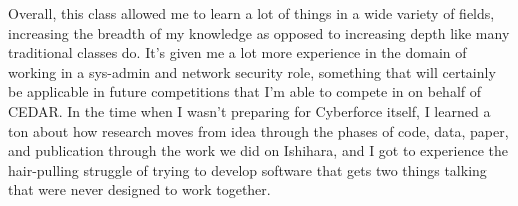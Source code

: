 \vspace{7mm}

Overall, this class allowed me to learn a lot of things in a wide variety of fields, increasing the breadth of my knowledge as opposed to increasing depth like many traditional classes do. It's given me a lot more experience in the domain of working in a sys-admin and network security role, something that will certainly be applicable in future competitions that I'm able to compete in on behalf of CEDAR. In the time when I wasn't preparing for Cyberforce itself, I learned a ton about how research moves from idea through the phases of code, data, paper, and publication through the work we did on Ishihara, and I got to experience the hair-pulling struggle of trying to develop software that gets two things talking that were never designed to work together.

